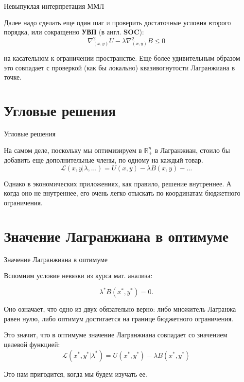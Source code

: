 \documentclass{beamer}
\begin{document}
\begin{frame}{Невыпуклая интерпретация ММЛ}

Далее надо сделать еще один шаг и проверить достаточные условия второго порядка, или сокращенно \textbf{УВП} (в англ. \textbf{SOC}):
$$ \nabla^2_{(x,y)}U - \lambda \nabla^2_{(x,y)} B \leqslant 0$$

на касательном к ограничении пространстве. Еще более удивительным образом это совпадает с проверкой (как бы локально) квазивогнутости Лагранжиана в точке.

\end{frame}


\section{Угловые решения}

\begin{frame}{Угловые решения}

На самом деле, поскольку мы оптимизируем в $\mathbb{R}^n_{+}$ в Лагранжиан, стоило бы добавить еще дополнительные члены, по одному на каждый товар. 
$$ \mathcal{L}(x,y | \lambda, \ldots) = U(x,y) - \lambda B(x,y) - \ldots$$

Однако в экономических приложениях, как правило, решение внутреннее. А когда оно не внутреннее, его очень легко отыскать по координатам бюджетного ограничения.

\end{frame}

\section{Значение Лагранжиана в оптимуме}

\begin{frame}{Значение Лагранжиана в оптимуме}

Вспомним условие невязки из курса мат. анализа:

$$ \lambda^{\ast} B(x^{\ast},y^{\ast}) = 0.$$

Оно означает, что одно из двух обязательно верно: либо множитель Лагранжа равен нулю, либо оптимум достигается на границе бюджетного ограничения.

Это значит, что в оптимуме значение Лагранжиана совпадает со значением целевой функцией:
$$ \mathcal{L}(x^{\ast}, y^{\ast} | \lambda^{\ast}) = U(x^{\ast}, y^{\ast}) - \lambda B(x^{\ast}, y^{\ast})$$ 

Это нам пригодится, когда мы будем изучать ее.

\end{frame}
\end{document}
